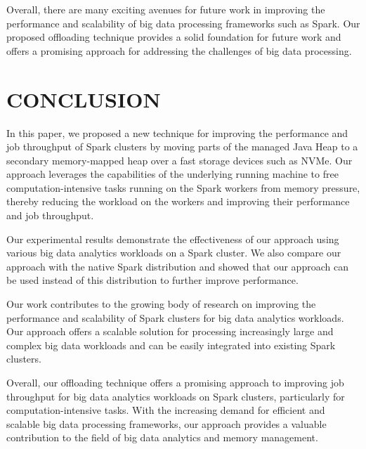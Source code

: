 \documentclass[twocolumn,10pt]{asme2e}
\begin{document}
Overall, there are many exciting avenues for future work in improving the performance and scalability of big data processing frameworks such as Spark. Our proposed offloading technique provides a solid foundation for future work and offers a promising approach for addressing the challenges of big data processing.

\section*{CONCLUSION}

In this paper, we proposed a new technique for improving the performance and job throughput of Spark clusters by moving parts of the managed Java Heap to a secondary memory-mapped heap over a fast storage devices such as NVMe. Our approach leverages the capabilities of the underlying running machine to free computation-intensive tasks running on the Spark workers from memory pressure, thereby reducing the workload on the workers and improving their performance and job throughput.

Our experimental results demonstrate the effectiveness of our approach using various big data analytics workloads on a Spark cluster. We also compare our approach with the native Spark distribution and showed that our approach can be used instead of this distribution to further improve performance.

Our work contributes to the growing body of research on improving the performance and scalability of Spark clusters for big data analytics workloads. Our approach offers a scalable solution for processing increasingly large and complex big data workloads and can be easily integrated into existing Spark clusters.

Overall, our offloading technique offers a promising approach to improving job throughput for big data analytics workloads on Spark clusters, particularly for computation-intensive tasks. With the increasing demand for efficient and scalable big data processing frameworks, our approach provides a valuable contribution to the field of big data analytics and memory management.




\begin{acknowledgment}
\end{acknowledgment}
\end{document}
